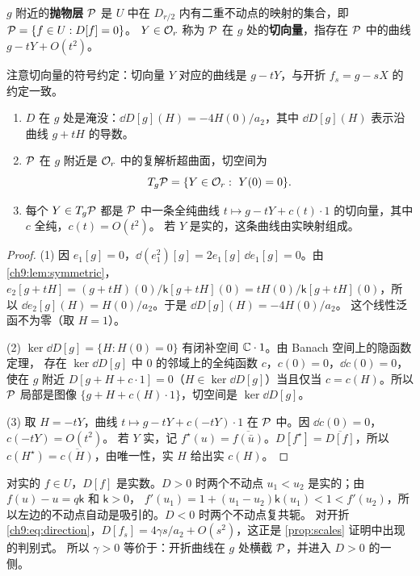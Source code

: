 \begin{definition}\label{ch9:def:stratum}
$g$ 附近的\textbf{抛物层} $\mathcal P$ 是 $U$ 中在 $D_{r/2}$ 内有二重不动点的映射的集合，即 $\mathcal P=\{f\in U:D[f]=0\}$。
$Y\in\mathcal O_r$ 称为 $\mathcal P$ 在 $g$ 处的\textbf{切向量}，指存在 $\mathcal P$ 中的曲线 $g-tY+O(t^2)$。
\end{definition}

注意切向量的符号约定：切向量 $Y$ 对应的曲线是 $g-tY$，与开折 $f_s=g-sX$ 的约定一致。

\begin{proposition}\label{ch9:prop:submersion}
\begin{enumerate}
\item $D$ 在 $g$ 处是淹没：$\dd D[g](H)=-4H(0)/a_2$，其中 $\dd D[g](H)$ 表示沿曲线 $g+tH$ 的导数。
\item $\mathcal P$ 在 $g$ 附近是 $\mathcal O_r$ 中的复解析超曲面，切空间为
\[
 T_g\mathcal P=\{Y\in\mathcal O_r:\ Y(0)=0\} .
\]
\item 每个 $Y\in T_g\mathcal P$ 都是 $\mathcal P$ 中一条全纯曲线 $t\mapsto g-tY+c(t)\cdot1$ 的切向量，其中 $c$ 全纯，$c(t)=O(t^2)$。
若 $Y$ 是实的，这条曲线由实映射组成。
\end{enumerate}
\end{proposition}

\begin{proof}
(1) 因 $e_1[g]=0$，$\dd(e_1^2)[g]=2e_1[g]\,\dd e_1[g]=0$。由 \cref{ch9:lem:symmetric}，
$e_2[g+tH]=(g+tH)(0)/\mathsf k[g+tH](0)=tH(0)/\mathsf k[g+tH](0)$，所以 $\dd e_2[g](H)=H(0)/a_2$。于是 $\dd D[g](H)=-4H(0)/a_2$。
这个线性泛函不为零（取 $H=1$）。

(2) $\ker\dd D[g]=\{H:H(0)=0\}$ 有闭补空间 $\mathbb{C}\cdot1$。由 Banach 空间上的隐函数定理，
存在 $\ker\dd D[g]$ 中 $0$ 的邻域上的全纯函数 $c$，$c(0)=0$，$\dd c(0)=0$，使在 $g$ 附近
$D[g+H+c\cdot1]=0$（$H\in\ker\dd D[g]$）当且仅当 $c=c(H)$。所以 $\mathcal P$ 局部是图像 $\{g+H+c(H)\cdot1\}$，切空间是 $\ker\dd D[g]$。

(3) 取 $H=-tY$，曲线 $t\mapsto g-tY+c(-tY)\cdot1$ 在 $\mathcal P$ 中。因 $\dd c(0)=0$，$c(-tY)=O(t^2)$。
若 $Y$ 实，记 $f^\star(u)=\overline{f(\bar u)}$。$D[f^\star]=\overline{D[f]}$，所以 $c(H^\star)=\overline{c(H)}$，由唯一性，实 $H$ 给出实 $c(H)$。
\end{proof}

\begin{remark}[实的图景]\label{ch9:rem:real-picture}
对实的 $f\in U$，$D[f]$ 是实数。$D>0$ 时两个不动点 $u_1<u_2$ 是实的；由 $f(u)-u=q\mathsf k$ 和 $\mathsf k>0$，
$f'(u_1)=1+(u_1-u_2)\mathsf k(u_1)<1<f'(u_2)$，所以左边的不动点自动是吸引的。$D<0$ 时两个不动点复共轭。
对开折 \eqref{ch9:eq:direction}，$D[f_s]=4\gamma s/a_2+O(s^2)$，这正是 \cref{prop:scales} 证明中出现的判别式。
所以 $\gamma>0$ 等价于：开折曲线在 $g$ 处横截 $\mathcal P$，并进入 $D>0$ 的一侧。
\end{remark}


